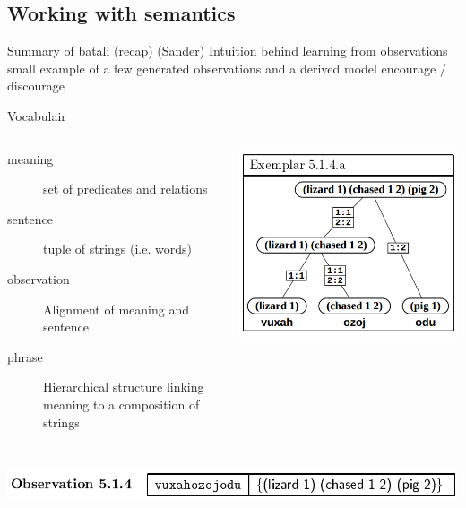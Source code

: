 \documentclass[11pt,a4paper,xcolor=dvipsnames]{beamer}
\begin{document}
\subsection{Working with semantics}
\begin{frame}
  Summary of batali (recap) (Sander)
Intuition behind learning from observations
small example of a few generated observations and a derived model
  encourage / discourage
\end{frame}

\begin{frame}{Vocabulair}
  \begin{columns}[c]
      \begin{description}
        \item[meaning] set of predicates and relations
        \item[sentence] tuple of strings (i.e. words)
        \item[observation] Alignment of meaning and sentence
        \item[phrase] Hierarchical structure linking meaning to a composition of strings
      \end{description}
      \includegraphics[scale=0.2]{assets/examplar514a.png}
  \end{columns}
  \hfill \includegraphics[scale=0.2]{assets/observation514.png}
\end{frame}
\end{document}
